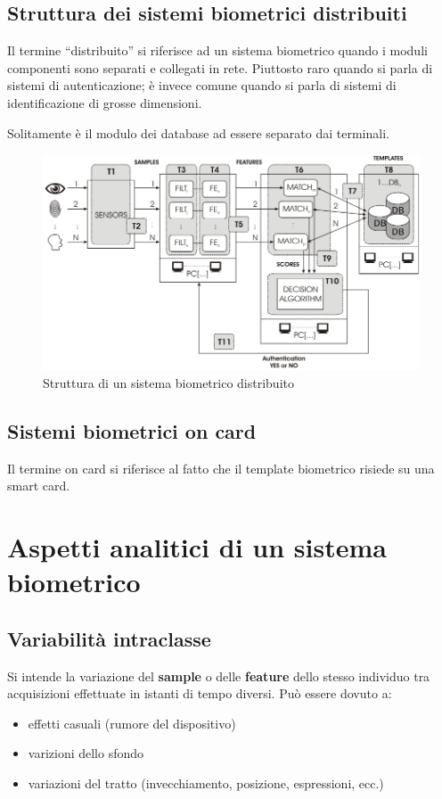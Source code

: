 \documentclass{report}
\begin{document}
\newpage
\section{Struttura dei sistemi biometrici distribuiti}

Il termine “distribuito” si riferisce ad un sistema biometrico quando i moduli componenti sono separati e collegati in rete.
Piuttosto raro quando si parla di sistemi di autenticazione; è invece comune quando si parla di sistemi di identificazione di grosse dimensioni. 


\noindent Solitamente è il modulo dei database ad essere separato dai terminali.
\begin{figure}[ht]
    \centering
    \includegraphics[width=0.95\linewidth]{images/distributed.png}
    \caption{Struttura di un sistema biometrico distribuito}
    \label{fig:distr}
\end{figure}

\section{Sistemi biometrici on card}
Il termine on card si riferisce al fatto che il template biometrico risiede su una smart card.



\chapter{Aspetti analitici di un sistema biometrico}

\section{Variabilità intraclasse}

Si intende la variazione del \textbf{sample} o delle \textbf{feature} dello stesso individuo tra acquisizioni effettuate in istanti di tempo diversi.
Può essere dovuto a:
\begin{itemize}
    \item effetti casuali (rumore del dispositivo)
    \item varizioni dello sfondo
    \item variazioni del tratto (invecchiamento, posizione, espressioni, ecc.)
\end{itemize}
\end{document}

